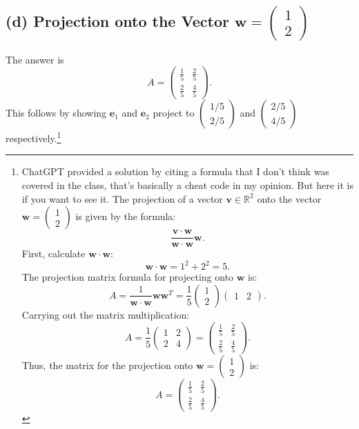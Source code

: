 \documentclass[11pt]{article}
\begin{document}
\subsection{(d) Projection onto the Vector \( \mathbf{w} = \begin{pmatrix} 1 \\ 2 \end{pmatrix} \)}
The answer is
\[
A = \begin{pmatrix} \frac{1}{5} & \frac{2}{5} \\ \frac{2}{5} & \frac{4}{5} \end{pmatrix}.
\]
This follows by showing $\mathbf{e}_1$ and $\mathbf{e}_2$ project to
$\begin{pmatrix} 1/5 \\ 2/5 \end{pmatrix}$
and $\begin{pmatrix} 2/5 \\ 4/5 \end{pmatrix}$
respectively.\footnote{ChatGPT provided a solution
    by citing a formula that I don't think was covered in the class,
    that's basically a cheat code in my opinion.
    But here it is if you want to see it.
    The projection of a vector \( \mathbf{v} \in \mathbb{R}^2 \) onto the vector
    \( \mathbf{w} = \begin{pmatrix} 1 \\ 2 \end{pmatrix} \) is given by the formula:
    \[
    \frac{\mathbf{v} \cdot \mathbf{w}}{\mathbf{w} \cdot \mathbf{w}} \mathbf{w}.
    \]
    First, calculate \( \mathbf{w} \cdot \mathbf{w} \):
    \[
    \mathbf{w} \cdot \mathbf{w} = 1^2 + 2^2 = 5.
    \]
    The projection matrix formula
    for projecting onto \( \mathbf{w} \) is:
    \[
    A = \frac{1}{\mathbf{w} \cdot \mathbf{w}} \mathbf{w} \mathbf{w}^T = \frac{1}{5} \begin{pmatrix} 1 \\ 2 \end{pmatrix} \begin{pmatrix} 1 & 2 \end{pmatrix}.
    \]
    Carrying out the matrix multiplication:
    \[
    A = \frac{1}{5} \begin{pmatrix} 1 & 2 \\ 2 & 4 \end{pmatrix} = \begin{pmatrix} \frac{1}{5} & \frac{2}{5} \\ \frac{2}{5} & \frac{4}{5} \end{pmatrix}.
    \]
    Thus, the matrix for the projection onto \( \mathbf{w} = \begin{pmatrix} 1 \\ 2 \end{pmatrix} \) is:
    \[
    A = \begin{pmatrix} \frac{1}{5} & \frac{2}{5} \\ \frac{2}{5} & \frac{4}{5} \end{pmatrix}.
    \]
}
\end{document}
